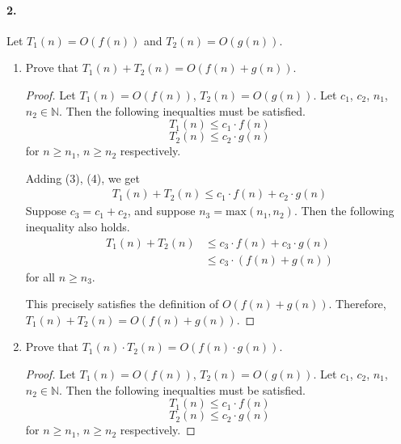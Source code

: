 \documentclass{article}
\begin{document}
\paragraph{2.} Let $T_1(n) = O(f(n))$ and $T_2(n) = O(g(n))$. 
    \begin{enumerate}[label=(\alph*).]
        \item Prove that $T_1(n) + T_2(n) = O(f(n) + g(n))$.
            \begin{proof}
                Let $T_1(n)=O(f(n))$, $T_2(n)=O(g(n)).$ Let $c_1$, $c_2$, $n_1$, $n_2 \in \mathbb{N}$.
                Then the following inequalties must be satisfied.
                \begin{equation}
                    T_1(n) \le c_1\cdot f(n)
                \end{equation}
                \begin{equation}
                    T_2(n) \le c_2\cdot g(n)
                \end{equation}
                for $n \ge n_1$, $n \ge n_2$ respectively.


                Adding (3), (4), we get
                \begin{align*}
                    T_1(n)+T_2(n) \le c_1\cdot f(n) + c_2\cdot g(n)
                \end{align*}
                Suppose $c_3 = c_1 + c_2$, and suppose $n_3 = \text{max}(n_1, n_2)$. 
                Then the following inequality also holds.
                \begin{align*}
                    T_1(n)+T_2(n) &\le c_3\cdot f(n) + c_3\cdot g(n)\\
                                  &\le c_3\cdot(f(n) + g(n))
                \end{align*}
                for all $n \ge n_3$.


                This precisely satisfies the definition of $O(f(n)+g(n))$. Therefore, 
                $T_1(n)+T_2(n) = O(f(n)+g(n))$.
            \end{proof}
        \item Prove that $T_1(n) \cdot T_2(n) = O(f(n)\cdot g(n))$.
            \begin{proof}
                Let $T_1(n) = O(f(n))$,  $T_2(n) = O(g(n))$. Let $c_1$, $c_2$, $n_1$, $n_2 \in \mathbb{N}$.
                Then the following inequalties must be satisfied.
                \begin{equation}
                    T_1(n) \le c_1\cdot f(n)
                \end{equation}
                \begin{equation}
                    T_2(n) \le c_2\cdot g(n)
                \end{equation}
                for $n \ge n_1$, $n \ge n_2$ respectively.
                


\end{proof}
\end{enumerate}
\end{document}
